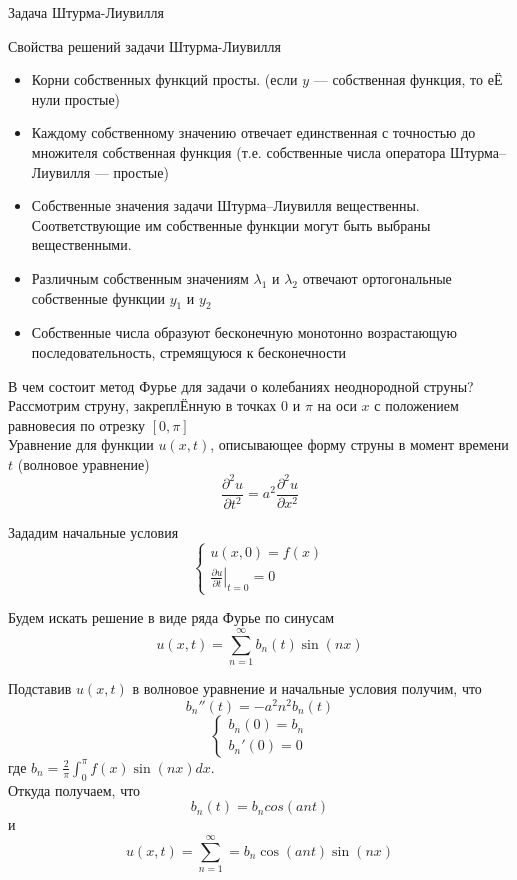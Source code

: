 \documentclass{article}
\begin{document}
\begin{section}{Задача Штурма-Лиувилля}
\begin{subsection}
Свойства решений задачи Штурма-Лиувилля
\begin{itemize}
	\item
	Корни собственных функций просты. (если $y$ --- собственная функция, то е{\footnotesize Ё} нули простые)
	\item
	Каждому собственному значению отвечает единственная с точностью до множителя собственная функция (т.е. собственные числа оператора Штурма–Лиувилля --- простые)
	\item
	Собственные значения задачи Штурма–Лиувилля вещественны. Соответствующие им собственные функции могут быть выбраны вещественными.
	\item
	Различным собственным значениям $ \lambda_1 $ и $ \lambda_2 $ отвечают ортогональные собственные функции $ y_1 $ и $ y_2 $
	\item
	Собственные числа образуют бесконечную монотонно возрастающую последовательность, стремящуюся к бесконечности
\end{itemize}
\end{subsection}

\begin{subsection}{В чем состоит метод Фурье для задачи о колебаниях неоднородной струны?}
Рассмотрим струну, закрепл{\footnotesize Ё}нную в точках $ 0 $ и $ \pi $ на оси $ x $ с положением равновесия по отрезку $ [0, \pi] $\\
Уравнение для функции $ u(x, t) $, описывающее форму струны в момент времени $ t $ (волновое уравнение)
\[ \frac{\partial^2u}{\partial t^2} = a^2 \frac{\partial^2u}{\partial x^2}\]

Зададим начальные условия 
\[ \left\{\begin{matrix}
	u(x, 0) = f(x)\\ 
	\left. \frac{\partial u}{\partial t} \right| _{t=0} = 0
\end{matrix}\right. \]

Будем искать решение в виде ряда Фурье по синусам
\[ u(x, t) = \sum_{n=1}^{\infty} b_n(t)\sin(nx) \]

Подставив $ u(x, t) $ в волновое уравнение и начальные условия получим, что
\[ b_n '' (t) = -a^2 n^2 b_n(t) \]
\[ \left\{\begin{matrix}
	b_n(0) = b_n\\ 
	b_n'(0) = 0
\end{matrix}\right. \]
где $b_n = \frac{2}{\pi} \int_{0}^{\pi}f(x) \sin(nx)dx$.\\
Откуда получаем, что
\[ b_n(t)=b_n cos(ant) \]
и 
\[ u(x, t) = \sum_{n=1}^{\infty} =b_n \cos(ant)\sin(nx) \]


\end{subsection}
\end{section}
\end{document}
